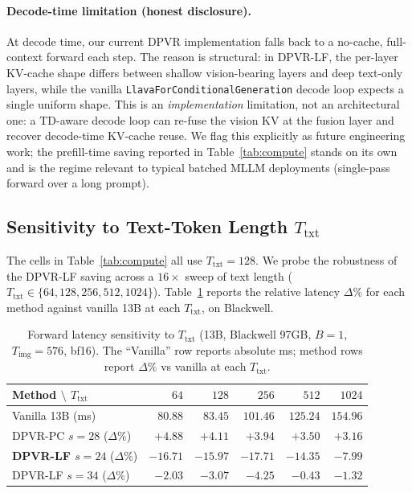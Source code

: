 \documentclass[a4paper,fleqn,review]{cas-sc}
\newcommand{\dpvr}{DPVR}
\newcommand{\dpvrlf}{DPVR-LF}
\newcommand{\dpvrpc}{DPVR-PC}
\begin{document}
\paragraph{Decode-time limitation (honest disclosure).} At decode
time, our current \dpvr{} implementation falls back to a
no-cache, full-context forward each step. The reason is structural:
in \dpvrlf{}, the per-layer KV-cache shape differs between
shallow vision-bearing layers and deep text-only layers, while the
vanilla \texttt{LlavaForConditionalGeneration} decode loop expects a
single uniform shape. This is an \emph{implementation} limitation,
not an architectural one: a TD-aware decode loop can re-fuse the
vision KV at the fusion layer and recover decode-time KV-cache
reuse. We flag this explicitly as future engineering work; the
prefill-time saving reported in Table~\ref{tab:compute} stands on
its own and is the regime relevant to typical batched MLLM
deployments (single-pass forward over a long prompt).

\subsection{Sensitivity to Text-Token Length
$T_{\mathrm{txt}}$}\label{sec:exp-ttxt}

The cells in Table~\ref{tab:compute} all use $T_{\mathrm{txt}} = 128$.
We probe the robustness of the \dpvrlf{} saving across a $16\times$
sweep of text length ($T_{\mathrm{txt}} \in \{64, 128, 256, 512,
1024\}$). Table~\ref{tab:ttxt} reports the relative latency
$\Delta\%$ for each method against vanilla 13B at each $T_{\mathrm{txt}}$,
on Blackwell.

\begin{table}[t]
\centering
\caption{Forward latency sensitivity to $T_{\mathrm{txt}}$ (13B,
Blackwell 97GB, $B = 1$, $T_{\mathrm{img}} = 576$, bf16). The
``Vanilla'' row reports absolute ms; method rows report
$\Delta\%$ vs vanilla at each $T_{\mathrm{txt}}$.}
\label{tab:ttxt}
\footnotesize
\setlength{\tabcolsep}{4pt}
\begin{tabular}{lrrrrr}
\toprule
Method $\setminus$ $T_{\mathrm{txt}}$ & $64$ & $128$ & $256$ & $512$ & $1024$ \\
\midrule
Vanilla 13B (ms)         & $80.88$  & $83.45$  & $101.46$ & $125.24$ & $154.96$ \\
\dpvrpc{} $s = 28$ ($\Delta\%$)   & $+4.88$ & $+4.11$ & $+3.94$  & $+3.50$  & $+3.16$  \\
\textbf{\dpvrlf{} $s = 24$} ($\Delta\%$) & $\bm{-16.71}$ & $\bm{-15.97}$ & $\bm{-17.71}$ & $\bm{-14.35}$ & $\bm{-7.99}$ \\
\dpvrlf{} $s = 34$ ($\Delta\%$)   & $-2.03$ & $-3.07$ & $-4.25$  & $-0.43$  & $-1.32$  \\
\bottomrule
\end{tabular}
\end{table}
\end{document}
